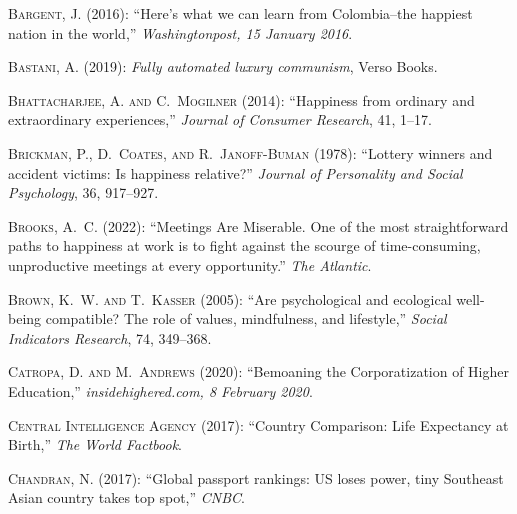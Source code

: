 \documentclass[10pt, letterpaper]{article}
\begin{document}
\begin{spacing}{2}
\begin{thebibliography}{120}
\textsc{Bargent, J.} (2016): \enquote{Here's what we can learn from
  Colombia--the happiest nation in the world,} \emph{Washingtonpost, 15 January
  2016}.

\textsc{Bastani, A.} (2019): \emph{Fully automated luxury communism}, Verso
  Books.

\textsc{Bhattacharjee, A. and C.~Mogilner} (2014): \enquote{Happiness from
  ordinary and extraordinary experiences,} \emph{Journal of Consumer Research},
  41, 1--17.

\textsc{Brickman, P., D.~Coates, and R.~Janoff-Buman} (1978): \enquote{Lottery
  winners and accident victims: Is happiness relative?} \emph{Journal of
  Personality and Social Psychology}, 36, 917--927.

\textsc{Brooks, A.~C.} (2022): \enquote{Meetings Are Miserable. One of the most
  straightforward paths to happiness at work is to fight against the scourge of
  time-consuming, unproductive meetings at every opportunity.} \emph{The
  Atlantic}.

\textsc{Brown, K.~W. and T.~Kasser} (2005): \enquote{Are psychological and
  ecological well-being compatible? The role of values, mindfulness, and
  lifestyle,} \emph{Social Indicators Research}, 74, 349--368.

\textsc{Catropa, D. and M.~Andrews} (2020): \enquote{Bemoaning the
  Corporatization of Higher Education,} \emph{insidehighered.com, 8 February
  2020}.

\textsc{{Central Intelligence Agency}} (2017): \enquote{Country Comparison:
  Life Expectancy at Birth,} \emph{The World Factbook}.

\textsc{Chandran, N.} (2017): \enquote{Global passport rankings: US loses
  power, tiny Southeast Asian country takes top spot,} \emph{CNBC}.


\end{thebibliography}
\end{spacing}
\end{document}
